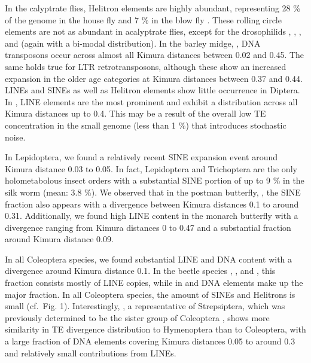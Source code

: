 In the calyptrate flies, Helitron elements are highly abundant,
representing 28 \% of the genome in the house fly 
and 7 \% in the blow fly . These rolling circle
elements are not as abundant in acalyptrate flies, except for the
drosophilids , , , and  (again with a bi-modal
distribution). In the barley midge, , DNA
transposons occur across almost all Kimura distances between 0.02 and
0.45. The same holds true for LTR retrotransposons, although these show
an increased expansion in the older age categories at Kimura distances
between 0.37 and 0.44.  LINEs and SINEs as well as Helitron elements
show little occurrence in Diptera. In , LINE
elements are the most prominent and exhibit a distribution across all
Kimura distances up to 0.4. This may be a result of the overall low TE
concentration in the small  genome (less than 1
\%) that introduces stochastic noise.

In Lepidoptera, we found a relatively recent SINE expansion event around
Kimura distance 0.03 to 0.05. In fact, Lepidoptera and Trichoptera are
the only holometabolous insect orders with a substantial SINE portion of
up to 9 \% in the silk worm  (mean: 3.8 \%). We
observed that in the postman butterfly, ,
the SINE fraction also appears with a divergence between Kimura
distances 0.1 to around 0.31. Additionally, we found high LINE content
in the monarch butterfly  with a divergence
ranging from Kimura distances 0 to 0.47 and a substantial fraction
around Kimura distance 0.09.

In all Coleoptera species, we found substantial LINE and DNA content
with a divergence around Kimura distance 0.1. In the beetle species
, , and
, this fraction consists mostly of LINE
copies, while in  and 
DNA elements make up the major fraction. In all Coleoptera species, the
amount of SINEs and Helitrons is small (cf.~Fig. 1). Interestingly,
, a representative of Strepsiptera, which
was previously determined to be the sister group of Coleoptera
\citep{Niehuis2012}, shows more similarity in TE divergence distribution
to Hymenoptera than to Coleoptera, with a large fraction of DNA elements
covering Kimura distances 0.05 to around 0.3 and relatively small
contributions from LINEs.

